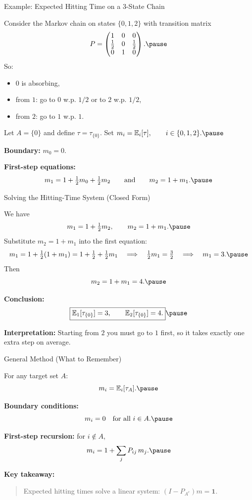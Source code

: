 \documentclass[aspectratio=169]{beamer}
\begin{document}
\begin{frame}{Example: Expected Hitting Time on a 3-State Chain}

Consider the Markov chain on states $\{0,1,2\}$ with transition matrix
\[
P=
\begin{pmatrix}
1 & 0 & 0\\
\frac12 & 0 & \frac12\\
0 & 1 & 0
\end{pmatrix}.
\vspace{-5mm}\pause
\]
So:
\begin{itemize}
  \item $0$ is absorbing,
  \item from $1$: go to $0$ w.p. $1/2$ or to $2$ w.p. $1/2$,\pause
  \item from $2$: go to $1$ w.p. $1$.\pause
\end{itemize}

\medskip
Let $A=\{0\}$ and define $\tau=\tau_{\{0\}}$.\pause
Set
$
m_i=\mathbb{E}_i[\tau],\qquad i\in\{0,1,2\}.\pause
$

\textbf{Boundary:} $m_0=0$.

\medskip
\textbf{First-step equations:}
\[
m_1 = 1+\tfrac12 m_0+\tfrac12 m_2
\qquad\text{and}\qquad
m_2 = 1+m_1.\pause
\]

\end{frame}

\begin{frame}{Solving the Hitting-Time System (Closed Form)}

We have
\[
m_1 = 1+\tfrac12 m_2,
\qquad
m_2 = 1+m_1.\pause
\]
Substitute $m_2=1+m_1$ into the first equation:
\[
m_1 = 1+\tfrac12(1+m_1)=1+\tfrac12+\tfrac12 m_1
\quad\Longrightarrow\quad
\tfrac12 m_1=\tfrac32
\quad\Longrightarrow\quad
m_1=3.\pause
\]
Then
\[
m_2=1+m_1=4.\pause
\]

\medskip
\textbf{Conclusion:}
\[
\boxed{\mathbb{E}_1[\tau_{\{0\}}]=3,\qquad \mathbb{E}_2[\tau_{\{0\}}]=4.}\pause
\vspace{-5mm}
\]

\medskip
\textbf{Interpretation:}
Starting from $2$ you must go to $1$ first, so it takes exactly one extra step on average.

\end{frame}

\begin{frame}{General Method (What to Remember)}

For any target set $A$:
\[
m_i=\mathbb{E}_i[\tau_A].\pause
\]

\medskip
\textbf{Boundary conditions:}
\[
m_i=0 \quad \text{for all } i\in A.\pause
\]

\medskip
\textbf{First-step recursion:} for $i\notin A$,
\[
m_i
=
1+\sum_{j} P_{ij}\,m_j.\pause
\]

\medskip
\textbf{Key takeaway:}
\begin{quote}
Expected hitting times solve a linear system: $(I-P_{A^c})m=\mathbf{1}$.\pause
\end{quote}

\end{frame}
\end{document}
